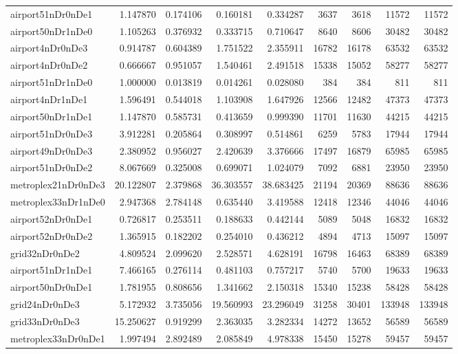 \begin{longtable}{|l|r|r|r|r|r|r|r|r|}
airport51nDr0nDe1 & 1.147870 & 0.174106 & 0.160181 & 0.334287 & 3637 & 3618 & 11572 & 11572 \\
airport50nDr1nDe0 & 1.105263 & 0.376932 & 0.333715 & 0.710647 & 8640 & 8606 & 30482 & 30482 \\
airport4nDr0nDe3 & 0.914787 & 0.604389 & 1.751522 & 2.355911 & 16782 & 16178 & 63532 & 63532 \\
airport4nDr0nDe2 & 0.666667 & 0.951057 & 1.540461 & 2.491518 & 15338 & 15052 & 58277 & 58277 \\
airport51nDr1nDe0 & 1.000000 & 0.013819 & 0.014261 & 0.028080 & 384 & 384 & 811 & 811 \\
airport4nDr1nDe1 & 1.596491 & 0.544018 & 1.103908 & 1.647926 & 12566 & 12482 & 47373 & 47373 \\
airport50nDr1nDe1 & 1.147870 & 0.585731 & 0.413659 & 0.999390 & 11701 & 11630 & 44215 & 44215 \\
airport51nDr0nDe3 & 3.912281 & 0.205864 & 0.308997 & 0.514861 & 6259 & 5783 & 17944 & 17944 \\
airport49nDr0nDe3 & 2.380952 & 0.956027 & 2.420639 & 3.376666 & 17497 & 16879 & 65985 & 65985 \\
airport51nDr0nDe2 & 8.067669 & 0.325008 & 0.699071 & 1.024079 & 7092 & 6881 & 23950 & 23950 \\
metroplex21nDr0nDe3 & 20.122807 & 2.379868 & 36.303557 & 38.683425 & 21194 & 20369 & 88636 & 88636 \\
metroplex33nDr1nDe0 & 2.947368 & 2.784148 & 0.635440 & 3.419588 & 12418 & 12346 & 44046 & 44046 \\
airport52nDr0nDe1 & 0.726817 & 0.253511 & 0.188633 & 0.442144 & 5089 & 5048 & 16832 & 16832 \\
airport52nDr0nDe2 & 1.365915 & 0.182202 & 0.254010 & 0.436212 & 4894 & 4713 & 15097 & 15097 \\
grid32nDr0nDe2 & 4.809524 & 2.099620 & 2.528571 & 4.628191 & 16798 & 16463 & 68389 & 68389 \\
airport51nDr1nDe1 & 7.466165 & 0.276114 & 0.481103 & 0.757217 & 5740 & 5700 & 19633 & 19633 \\
airport50nDr0nDe1 & 1.781955 & 0.808656 & 1.341662 & 2.150318 & 15340 & 15238 & 58428 & 58428 \\
grid24nDr0nDe3 & 5.172932 & 3.735056 & 19.560993 & 23.296049 & 31258 & 30401 & 133948 & 133948 \\
grid33nDr0nDe3 & 15.250627 & 0.919299 & 2.363035 & 3.282334 & 14272 & 13652 & 56589 & 56589 \\
metroplex33nDr0nDe1 & 1.997494 & 2.892489 & 2.085849 & 4.978338 & 15450 & 15278 & 59457 & 59457 \\

\end{longtable}
